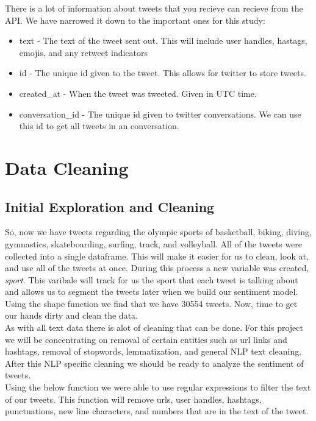 \documentclass[12pt]{article}
\begin{document}
        There is a lot of information about tweets that you recieve can recieve from the API. We have narrowed it down to the important ones for this study:
        \begin{itemize}
            \item text - The text of the tweet sent out. This will include user handles, hastags, emojis, and any retweet indicators
            \item id - The unique id given to the tweet. This allows for twitter to store tweets.
            \item created\_at - When the tweet was tweeted. Given in UTC time.
            \item conversation\_id - The unique id given to twitter conversations. We can use this id to get all tweets in an conversation.
        \end{itemize}
    \section{Data Cleaning}
        \subsection{Initial Exploration and Cleaning}
            So, now we have tweets regarding the olympic sports of basketball, biking, diving, gymnastics, skateboarding, surfing, track, and volleyball. All of the tweets were collected
            into a single dataframe. This will make it easier for us to clean, look at, and use all of the tweets at once. During this process a new variable was created,
            \textit{sport}. This varibale will track for us the sport that each tweet is talking about and allows us to segment the tweets later when we build our sentiment model. \\
        
            Using the shape function we find that we have 30554 tweets. Now, time to get our hands dirty and clean the data. \\
        
            As with all text data there is alot of cleaning that can be done. For this project we will be concentrating on removal of certain entities such as url links and hashtags, removal
            of stopwords, lemmatization, and general NLP text cleaning. After this NLP specific cleaning we should be ready to analyze the sentiment of tweets.\\

            Using the below function we were able to use regular expressions to filter the text of our tweets. This function will remove urls, user handles, hashtags, punctuations, new line 
            characters, and numbers that are in the text of the tweet. \\
\end{document}
